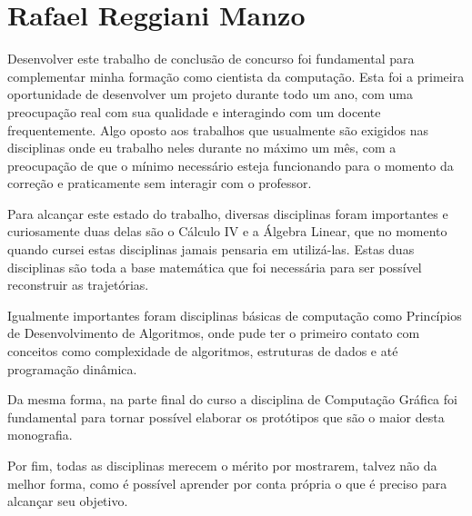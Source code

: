 \chapter{Rafael Reggiani Manzo}
Desenvolver este trabalho de conclusão de concurso foi fundamental para complementar minha formação como cientista da computação. Esta foi a primeira oportunidade de desenvolver um projeto durante todo um ano, com uma preocupação real com sua qualidade e interagindo com um docente frequentemente. Algo oposto aos trabalhos que usualmente são exigidos nas disciplinas onde eu trabalho neles durante no máximo um mês, com a preocupação de que o mínimo necessário esteja funcionando para o momento da correção e praticamente sem interagir com o professor.

Para alcançar este estado do trabalho, diversas disciplinas foram importantes e curiosamente duas delas são o Cálculo IV e a Álgebra Linear, que no momento quando cursei estas disciplinas jamais pensaria em utilizá-las. Estas duas disciplinas são toda a base matemática que foi necessária para ser possível reconstruir as trajetórias.

Igualmente importantes foram disciplinas básicas de computação como Princípios de Desenvolvimento de Algoritmos, onde pude ter o primeiro contato com conceitos como complexidade de algoritmos, estruturas de dados e até programação dinâmica.

Da mesma forma, na parte final do curso a disciplina de Computação Gráfica foi fundamental para tornar possível elaborar os protótipos que são o maior desta monografia.

Por fim, todas as disciplinas merecem o mérito por mostrarem, talvez não da melhor forma, como é possível aprender por conta própria o que é preciso para alcançar seu objetivo.
